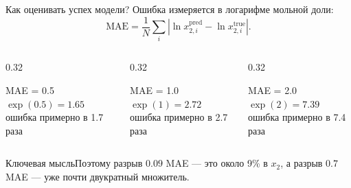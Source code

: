 \documentclass[aspectratio=169,10pt]{beamer}
\newcommand{\keybox}[1]{\begin{block}{Ключевая мысль}#1\end{block}}
\begin{document}
\begin{frame}{Как оценивать успех модели?}
  \small
  Ошибка измеряется в логарифме мольной доли:
  \[
    \mathrm{MAE}=\frac1N\sum_i\left|\ln x_{2,i}^{\mathrm{pred}}-\ln x_{2,i}^{\mathrm{true}}\right|.
  \]
  \vspace{0.25em}
  \begin{columns}[T,onlytextwidth]
    \begin{column}{0.32\textwidth}
      \begin{block}{MAE = 0.5}
        \centering
        \Large $\exp(0.5)=1.65$\\[-0.1em]
        \scriptsize ошибка примерно в 1.7 раза
      \end{block}
    \end{column}
    \begin{column}{0.32\textwidth}
      \begin{block}{MAE = 1.0}
        \centering
        \Large $\exp(1)=2.72$\\[-0.1em]
        \scriptsize ошибка примерно в 2.7 раза
      \end{block}
    \end{column}
    \begin{column}{0.32\textwidth}
      \begin{block}{MAE = 2.0}
        \centering
        \Large $\exp(2)=7.39$\\[-0.1em]
        \scriptsize ошибка примерно в 7.4 раза
      \end{block}
    \end{column}
  \end{columns}
  \vspace{0.35em}
  \keybox{\scriptsize Поэтому разрыв $0.09$ MAE — это около 9\% в $x_2$, а разрыв $0.7$ MAE — уже почти двукратный множитель.}
\end{frame}
\end{document}
